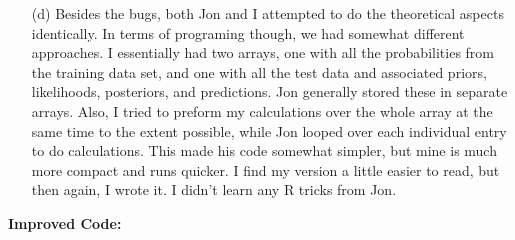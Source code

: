 \documentclass[11pt]{article}
\theoremstyle{definition}
\begin{document}
\begin{itemize}
\begin{itemize}
\begin{itemize}
                \end{itemize}
                In the end, both my version of the code and Jon's with my fixes had an accuracy of $78.0\% $.
            \item[(d)] Besides the bugs, both Jon and I attempted to do the theoretical aspects identically. In terms of programing though, we had somewhat different approaches. I essentially had two arrays, one with all the probabilities from the training data set, and one with all the test data and associated priors, likelihoods, posteriors, and predictions. Jon generally stored these in separate arrays. Also, I tried to preform my calculations over the whole array at the same time to the extent possible, while Jon looped over each individual entry to do calculations. This made his code somewhat simpler, but mine is much more compact and runs quicker. I find my version a little easier to read, but then again, I wrote it. I didn't learn any R tricks from Jon. \\

        \end{itemize}
    {\bf Improved Code:}
\end{itemize}
    
\end{document}
